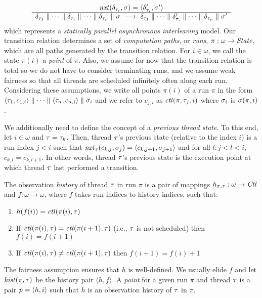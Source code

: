 \[
\begin{array}{c}
\mathit{nxt}(\delta_{\tau_i},\sigma) = \langle \delta_{\tau_i}',\sigma'\rangle \\ \hline
\delta_{\tau_1} \parallel \cdots \parallel \delta_{\tau_i} \parallel \cdots \parallel \delta_{\tau_n}\parallel \sigma\ \longrightarrow\
\delta_{\tau_1} \parallel \cdots \parallel \delta_{\tau_i}' \parallel \cdots \parallel \delta_{\tau_n}\parallel \sigma'
\end{array}
\]
which represents a \textit{statically parallel asynchronous interleaving} model.
Our transition relation determines a set of  \textit{computation paths}, or \textit{runs}, $\pi:\omega \rightarrow \mathit{State}$, which are all paths
generated by the transition relation. For $i\in\omega$, we call the state $\pi(i)$ a \emph{point} of $\pi$. 
Also, we assume for now that the transition relation is total so we do not have to consider terminating runs, and we assume
weak fairness so that all threads are scheduled infinitely often along each run. Considering these assumptions, we write all points $\pi(i)$ of a run
$\pi$ in the form $\langle\tau_1,c_{1,i}\rangle \parallel \cdots \parallel \langle\tau_n,c_{n,i}\rangle\parallel \sigma_i$ and we refer to $c_{j,i}$ as $\mathit{ctl}(\pi,\tau_j,i)$ where $\sigma_i$ is $\sigma(\pi,i)$.

We additionally need to define the concept of a \emph{previous thread state}. To this end, let $i\in\omega$ and $\tau=\tau_k$. Then,
thread $\tau$'s previous state (relative to the index $i$) is a run index $j<i$ such that 
$\mathit{nxt}_{\tau}(c_{k,j},\sigma_j) = \langle c_{k,j+1},\sigma_{j+1}\rangle$ and for all $l:j<l<i$, $c_{k,l} = c_{k,l+1}$. In other words, thread $\tau$'s previous state is the execution point at which thread $\tau$ last performed a transition.

The observation \textit{history} of thread $\tau$ in run $\pi$ is a pair of mappings $h_{\pi,\tau}:\omega\rightarrow\mathit{Ctl}$ and $f:\omega \rightarrow \omega$, where $f$ takes run indices to history indices, such that:
\begin{enumerate}
\item $h(f(i)) = \mathit{ctl}(\pi(i),\tau)$
\item If $\mathit{ctl}(\pi(i),\tau) = \mathit{ctl}(\pi(i+1),\tau)$ (i.e., $\tau$ is not scheduled) then $f(i) = f(i+1)$
\item If $\mathit{ctl}(\pi(i),\tau) \neq \mathit{ctl}(\pi(i+1),\tau)$ then $f(i+1) = f(i) + 1$
\end{enumerate}

The fairness assumption ensures that $h$ is well-defined. We usually elide $f$ and let $\mathit{hist}(\pi,\tau)$ be the history pair $\langle h,f\rangle$.
A \textit{point} for a given run $\pi$ and thread $\tau$ is a pair $p = \langle h,i\rangle$ such that $h$ is an observation history of $\tau$ in $\pi$.
